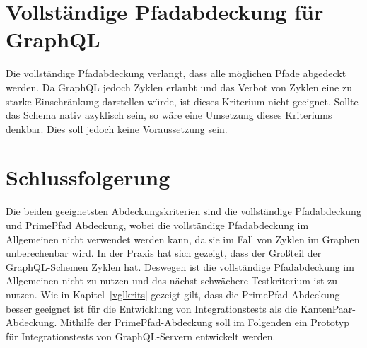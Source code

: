 \section{Vollständige Pfadabdeckung für GraphQL}

Die vollständige Pfadabdeckung verlangt, dass alle möglichen Pfade abgedeckt werden.
Da GraphQL jedoch Zyklen erlaubt und das Verbot von Zyklen eine zu starke Einschränkung darstellen würde, ist dieses Kriterium nicht geeignet.
Sollte das Schema nativ azyklisch sein, so wäre eine Umsetzung dieses Kriteriums denkbar.
Dies soll jedoch keine Voraussetzung sein.

\section{Schlussfolgerung}
\label{fazitcov}

Die beiden geeignetsten Abdeckungskriterien sind die vollständige Pfadabdeckung und PrimePfad Abdeckung, wobei die vollständige Pfadabdeckung im
Allgemeinen nicht verwendet werden kann, da sie im Fall von Zyklen im Graphen unberechenbar wird.
In der Praxis hat sich gezeigt, dass der Großteil der GraphQL-Schemen Zyklen hat.
Deswegen ist die vollständige Pfadabdeckung im Allgemeinen nicht zu nutzen und das nächst schwächere Testkriterium ist zu nutzen.
Wie in Kapitel~\ref{vglkrits} gezeigt gilt, dass die PrimePfad-Abdeckung besser geeignet ist für die Entwicklung von Integrationstests als die KantenPaar-Abdeckung.
Mithilfe der PrimePfad-Abdeckung soll im Folgenden ein Prototyp für Integrationstests von GraphQL-Servern entwickelt werden.




